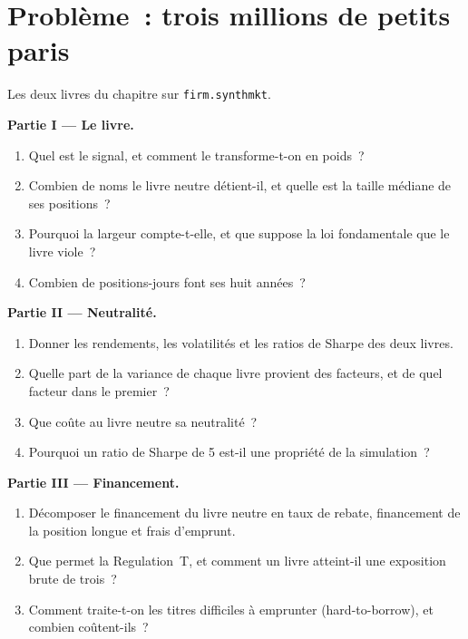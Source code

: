 \section{Problème~: trois millions de petits paris}

\begin{problem}\label{pb:s1:anatomy-of-a-stat-arb-book:1}
Les deux livres du chapitre sur \texttt{firm.synthmkt}.

\medskip\noindent\textbf{Partie I --- Le livre.}
\begin{enumerate}
\item Quel est le signal, et comment le transforme-t-on en poids~?
\item Combien de noms le livre neutre détient-il, et quelle est la taille médiane de ses positions~?
\item Pourquoi la largeur compte-t-elle, et que suppose la loi fondamentale que le livre viole~?
\item Combien de positions-jours font ses huit années~?
\end{enumerate}

\medskip\noindent\textbf{Partie II --- Neutralité.}
\begin{enumerate}[resume]
\item Donner les rendements, les volatilités et les ratios de Sharpe des deux livres.
\item Quelle part de la variance de chaque livre provient des facteurs, et de quel facteur dans le premier~?
\item Que coûte au livre neutre sa neutralité~?
\item Pourquoi un ratio de Sharpe de 5 est-il une propriété de la simulation~?
\end{enumerate}

\medskip\noindent\textbf{Partie III --- Financement.}
\begin{enumerate}[resume]
\item Décomposer le financement du livre neutre en taux de rebate, financement de la position longue et frais d'emprunt.
\item Que permet la Regulation~T, et comment un livre atteint-il une exposition brute de trois~?
\item Comment traite-t-on les titres difficiles à emprunter (hard-to-borrow), et combien coûtent-ils~?
\end{enumerate}


\end{problem}
